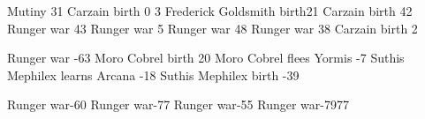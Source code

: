 \newcommand{\Symeon}  {S\ydiphthong m\"eon{}\xspace} %
\newcommand{\Weylon}  {Weylon{}\xspace} %

             {Mutiny}                   {31}
  {Carzain birth}            {0}
  {3}
    {Frederick Goldsmith birth}{21}
            {Carzain birth}            {42}
      {Runger war}               {43}
       {Runger war}               {5}
       {Runger war}               {48}
             {Runger war}               {38}
      {Carzain birth}            {2}

\begin{comment}
\subsubsection{The Ishrah}
\end{comment}

\newcommand{\MoroCobrel}       {Moro Cobrel\xspace}
\newcommand{\Cobrel}           {Cobrel\xspace} %
\newcommand{\Cornel}           {Cobrel\xspace}
\newcommand{\MissCornel}       {\Miss Cobrel\xspace}

              {Runger war}               {-63}
        {Moro Cobrel birth}        {20}
   {Moro Cobrel flees Yormis} {-7}
          {Suthis Mephilex learns Arcana} {-18}
             {Suthis Mephilex birth}         {-39}

\newcommand{\Ambrose}          {Amras\xspace} %
\newcommand{\Onatol}           {Onatol\xspace}
\newcommand{\Anatoli}          {\Onatol}


\newcommand{\Sanyor} {Sanyor\xspace}

 {Runger war}{-60}
           {Runger war}{-77}
           {Runger war}{-55}
       {Runger war}{-79}{77} %

\begin{comment}
\subsubsection{The Military}
\end{comment}

